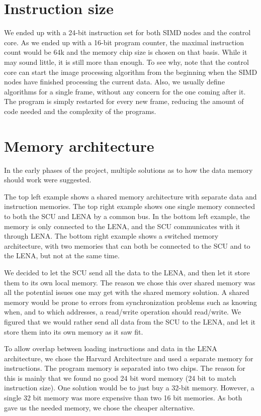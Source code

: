 \section{Instruction size}
We ended up with a 24-bit instruction set for both \ac{SIMD} nodes and the
control core. As we ended up with a 16-bit program counter, the maximal
instruction count would be 64k and the memory chip size is chosen on that
basis. While it may sound little, it is still more than enough. To see why, note
that the control core can start the image processing algorithm from the
beginning when the \ac{SIMD} nodes have finished processing the current data.
Also, we usually define algorithms for a single frame, without any concern for
the one coming after it. The program is simply restarted for every new frame,
reducing the amount of code needed and the complexity of the programs.

\section {Memory architecture}
 

In the early phases of the project, multiple solutions as to how the data memory
should work were suggested. 

The top left example shows a shared memory architecture with separate data and
instruction memories. The top right example shows one single memory connected to
both the SCU and LENA by a common bus. In the bottom left example, the memory is
only connected to the LENA, and the SCU communicates with it through LENA. 
The bottom right example shows a switched memory architecture, with two memories
that can both be connected to the SCU and to the LENA, but not at the same time.

We decided to let the \ac{SCU} send all the data to
the \ac{LENA}, and then let it store them to its own local memory. The reason we
chose this over shared memory was all the potential issues one may get with the
shared memory solution. A shared memory would be prone to errors from
synchronization problems such as knowing when, and to which addresses, a
read/write operation should read/write. We figured that we would rather send all
data from the \ac{SCU} to the \ac{LENA}, and let it store them into its own
memory as it saw fit.

To allow overlap between loading instructions and data in the LENA architecture,
we chose the Harvard Architecture and used a separate memory for
instructions. The program memory is separated into two chips. The reason for
this is mainly that we found no good 24 bit word memory (24 bit to match instruction
size). One solution would be to just buy a 32-bit memory. However, a single 32 bit
memory was more expensive than two 16 bit memories. As both gave us the needed
memory, we chose the cheaper alternative.

